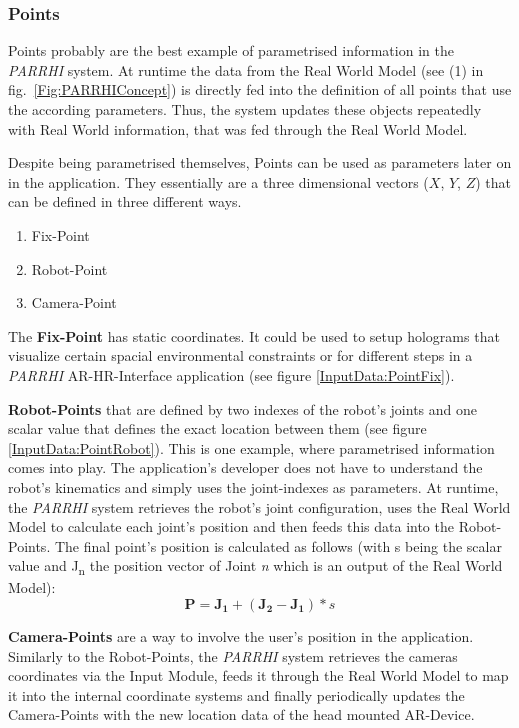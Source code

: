 \subsubsection{Points}\label{Section:Points}
Points probably are the best example of parametrised information in the \textit{PARRHI} system. At runtime the data from the Real World Model (see (1) in fig.~\ref{Fig:PARRHIConcept}) is directly fed into the definition of all points that use the according parameters. Thus, the system updates these objects repeatedly with Real World information, that was fed through the Real World Model.
 
Despite being parametrised themselves, Points can be used as parameters later on in the application. They essentially are a three dimensional vectors ($X$, $Y$, $Z$) that can be defined in three different ways. 
\begin{enumerate}
	\setlength\itemsep{-1em}
	\item Fix-Point
	\item Robot-Point
	\item Camera-Point
\end{enumerate}

The \textbf{Fix-Point} has static coordinates. It could be used to setup holograms that visualize certain spacial environmental constraints or for different steps in a \textit{PARRHI} AR-HR-Interface application (see figure \ref{InputData:PointFix}).

\textbf{Robot-Points} that are defined by two indexes of the robot's joints and one scalar value that defines the exact location between them (see figure \ref{InputData:PointRobot}). This is one example, where parametrised information comes into play. The application's developer does not have to understand the robot's kinematics and simply uses the joint-indexes as parameters. At runtime, the \textit{PARRHI} system retrieves the robot's joint configuration, uses the Real World Model to calculate each joint's position and then feeds this data into the Robot-Points. The final point's position is calculated as follows (with s being the scalar value and J\textsubscript{n} the position vector of Joint \textit{n} which is an output of the Real World Model):
\begin{equation}
\boldsymbol{P} = \boldsymbol{J_1} + (\boldsymbol{J_2}-\boldsymbol{J_1}) * s
\end{equation}

\textbf{Camera-Points} are a way to involve the user's position in the application. Similarly to the Robot-Points, the \textit{PARRHI} system retrieves the cameras coordinates via the Input Module, feeds it through the Real World Model to map it into the internal coordinate systems and finally periodically updates the Camera-Points with the new location data of the head mounted AR-Device.


